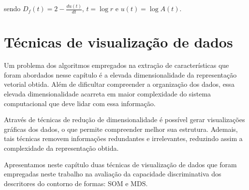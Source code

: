 \noindent sendo  $D_f(t) = 2 - \frac{du(t)}{dt}$, $t = \log{r}$ e $u(t) = \log{A(t)}$.


\section{Técnicas de visualização de dados}

Um problema dos algoritmos empregados na extração de características que foram abordados nesse capítulo é a elevada dimensionalidade da representação vetorial obtida. Além de dificultar compreender a organização dos dados, essa elevada dimensionalidade acarreta em maior complexidade do sistema computacional que deve lidar com essa informação. 

Através de técnicas de redução de dimensionalidade é possível gerar visualizações gráficas dos dados, o que permite compreender melhor sua estrutura. Ademais, tais técnicas removem informações redundantes e irrelevantes, reduzindo assim a complexidade da representação obtida.

Apresentamos neste capítulo duas técnicas de visualização de dados que foram empregadas neste trabalho na avaliação da capacidade discriminativa dos descritores do contorno de formas: \acf{SOM} e \acf{MDS}.



